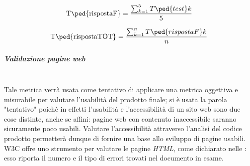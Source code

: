 \begin{displaymath}
	\mbox{T\ped{rispostaF}} =\frac{\sum_{k=1}^5 T\ped{test}k}{5}
\end{displaymath}

\begin{displaymath}
	\mbox{T\ped{rispostaTOT}} =\frac{\sum_{k=1}^n T\ped{rispostaF}k}{n}
\end{displaymath}


\subparagraph{Validazione pagine web}
\label{AppB:Usabilita}
~\\Tale metrica verrà usata come tentativo di applicare una metrica oggettiva e misurabile per valutare l'usabilità del prodotto finale; si è usata la parola "tentativo" poichè in effetti l'usabilità e l'accessibilità di un sito web sono due cose distinte, anche se affini: pagine web con contenuto inaccessibile saranno sicuramente poco usabili. Valutare l'accessibilità attraverso l'analisi del codice prodotto permetterà dunque di fornire una base allo sviluppo di pagine usabili.
W3C offre uno strumento per valutare le pagine \emph{HTML}, come dichiarato nelle \NdP{}: esso riporta il numero e il tipo di errori trovati nel documento in esame.

